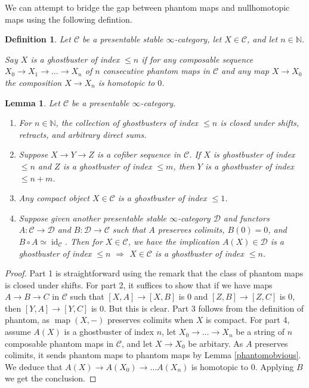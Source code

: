 \documentclass[12pt]{article}
\newtheorem{lemma}[theorem]{Lemma}
\newtheorem{definition}[theorem]{Definition}
\newcommand{\on}{\operatorname}
\begin{document}
We can attempt to bridge the gap between phantom maps and nullhomotopic maps using the following defintion.

\begin{definition}
Let $\mathcal{C}$ be a presentable stable $\infty$-category, let $X\in\mathcal{C}$, and let $n\in\mathbb{N}$.

Say $X$ is a \emph{ghostbuster of index $\leq n$} if for any composable sequence $X_0 \to X_1\to\ldots\to X_n$ of $n$ consecutive phantom maps in $\mathcal{C}$ and any map $X\to X_0$ the composition $X \to X_n$ is homotopic to $0$.
\end{definition}

\begin{lemma}\label{ghostbuster}
Let $\mathcal{C}$ be a presentable $\infty$-category.
\begin{enumerate}
\item For $n\in\mathbb{N}$, the collection of ghostbusters of index $\leq n$ is closed under shifts, retracts, and arbitrary direct sums.
\item Suppose $X \to Y \to Z$ is a cofiber sequence in $\mathcal{C}$.  If $X$ is ghostbuster of index $\leq n$ and $Z$ is a ghostbuster of index $\leq m$, then $Y$ is a ghostbuster of index $\leq n+m$.
\item Any compact object $X\in\mathcal{C}$ is a ghostbuster of index $\leq 1$.
\item Suppose given another presentable stable $\infty$-category $\mathcal{D}$ and functors $A:\mathcal{C}\to\mathcal{D}$ and $B:\mathcal{D}\to\mathcal{C}$ such that $A$ preserves colimits, $B(0)=0$, and $B\circ A \simeq \on{id}_{\mathcal{C}}$.  Then for $X\in\mathcal{C}$, we have the implication $A(X)\in\mathcal{D}$ is a ghostbuster of index $\leq n$ $\Rightarrow$ $X\in\mathcal{C}$ is a ghostbuster of index $\leq n$.
\end{enumerate}
\end{lemma}
\begin{proof}
Part 1 is straightforward using the remark that the class of phantom maps is closed under shifts.  For part 2, it suffices to show that if we have maps $A \to B \to C$ in $\mathcal{C}$ such that $[X,A] \to [X,B]$ is $0$ and $[Z,B]\to [Z,C]$ is $0$, then $[Y,A]\to [Y,C]$ is $0$.  But this is clear.  Part 3 follows from the definition of phantom, as $\on{map}(X,-)$ preserves colimits when $X$ is compact.  For part 4, assume $A(X)$ is a ghostbuster of index $n$, let $X_0\to\ldots \to X_n$ be a string of $n$ composable phantom maps in $\mathcal{C}$, and let $X\to X_0$ be arbitary.  As $A$ preserves colimits, it sends phantom maps to phantom maps by Lemma \ref{phantomobvious}.  We deduce that $A(X)\to A(X_0)\to\ldots A(X_n)$ is homotopic to $0$.  Applying $B$ we get the conclusion.
\end{proof}
\end{document}
